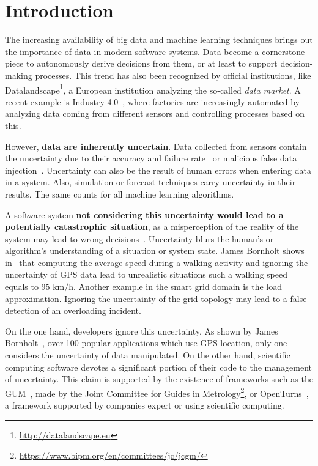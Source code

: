 \section{Introduction}
\label{sec:introduction}

The increasing availability of big data and machine learning techniques brings out the importance of data in modern software systems.
Data become a cornerstone piece to autonomously derive decisions from them, or at least to support decision-making processes.
This trend has also been recognized by official institutions, like Datalandscape\footnote{\url{http://datalandscape.eu}}, a European institution analyzing the so-called \textit{data market}.
A recent example is Industry 4.0~\cite{DBLP:journals/bise/LasiFKFH14}, where factories are increasingly automated by analyzing data coming from different sensors and controlling processes based on this.

However, \textbf{data are inherently uncertain}. 
Data collected from sensors contain the uncertainty due to their accuracy and failure rate~\cite{DBLP:conf/asplos/BornholtMM14, metrology2008evaluation} or malicious false data injection~\cite{liang20172015}.
Uncertainty can also be the result of human errors when entering data in a system.
Also, simulation or forecast techniques carry uncertainty in their results.
The same counts for all machine learning algorithms.

A software system \textbf{not considering this uncertainty would lead to a potentially catastrophic situation}, as a misperception of the reality of the system may lead to wrong decisions~\cite{DBLP:conf/asplos/BornholtMM14}.
Uncertainty blurs the human's or algorithm's understanding of a situation or system state.
James Bornholt shows in~\cite{bornholt2013abstractions} that computing the average speed during a walking activity and ignoring the uncertainty of GPS data lead to unrealistic situations such a walking speed equals to 95 km/h.
Another example in the smart grid domain is the load approximation.
Ignoring the uncertainty of the grid topology may lead to a false detection of an overloading incident.

On the one hand, developers ignore this uncertainty.
As shown by James Bornholt~\cite{bornholt2013abstractions}, over 100 popular applications which use GPS location, only one considers the uncertainty of data manipulated.
On the other hand, scientific computing software devotes a significant portion of their code to the management of uncertainty.
This claim is supported by the existence of frameworks such as the GUM~\cite{metrology2008evaluation}, made by the Joint Committee for Guides in Metrology\footnote{\url{https://www.bipm.org/en/committees/jc/jcgm/}}, or OpenTurns~\cite{baudin2017openturns}, a framework supported by companies expert or using scientific computing.

